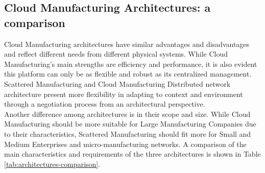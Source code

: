 \subsection{Cloud Manufacturing Architectures: a comparison}
Cloud Manufacturing architectures have similar advantages and disadvantages and reflect different needs from different physical systems. While Cloud Manufacturing's main strengths are efficiency and performance, it is also evident this platform can only be as flexible and robust as its centralized management. Scattered Manufacturing and Cloud Manufacturing Distributed network architecture present more flexibility in adapting to context and environment through a negotiation process from an architectural perspective.\\
Another difference among architectures is in their scope and size. While Cloud Manufacturing should be more suitable for Large Manufacturing Companies due to their characteristics, Scattered Manufacturing should fit more for Small and Medium Enterprises and micro-manufacturing networks. A comparison of the main characteristics and requirements of the three architectures is shown in Table \ref{tab:architectures-comparison}.

